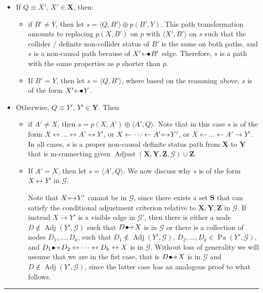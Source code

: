 \documentclass[twoside]{article}
\DeclareMathOperator{\Pa}{Pa}
\DeclareMathOperator{\Adj}{Adj}
\DeclareMathOperator{\Adjust}{Adjust}
\newcommand{\adjustb}[2][X,Y,Z]{\Adjust(\mb{#1},#2)}
\newcommand{\mb}[1]{\mathbf{#1}}
\newcommand{\g}[1][G]{\mathcal{#1}}
\newenvironment{proofof}[1][]{\begin{trivlist}
\item[\hskip \labelsep {\bfseries Proof of #1.}]}{\hfill\BlackBox\end{trivlist}}
\newcommand{\BlackBox}{\rule{1.5ex}{1.5ex}}
\newcommand{\bulletarrow}{
  \setlength{\unitlength}{1mm}
  \begin{picture}(5,1)(0,0)
    \put(0.2,0){$\bullet$}
    \put(1,0){$\rightarrow$}
  \end{picture}
}
\newcommand{\arrowbullet}{
  \setlength{\unitlength}{1mm}
  \begin{picture}(5,1)(0,0)
    \put(0.2,0){$\leftarrow$}
    \put(3,0){$\bullet$}
  \end{picture}
}
\newcommand{\circarrow}{
  \setlength{\unitlength}{1mm}
  \begin{picture}(5,1)(0,0)
    \put(1,1){\circle{1}}
    \put(1.2,0){$\rightarrow$}
  \end{picture}
}
\begin{document}
\begin{proofof}[Lemma \ref{lem:adjust-and-o-pag-helper}]
\begin{itemize}
     
        \item If $Q \equiv X'$, $X' \in \mb{X}$, then:
          \begin{itemize}
            \item if $B' \neq Y$, then let $s = \langle Q,B' \rangle \oplus p(B',Y)$. This path transformation amounts to replacing $p(X,B')$ on $p$ with  $\langle X', B' \rangle$ on $s$ such that the collider / definite non-collider status of $B'$ is the same on both paths, and $s$ is a non-causal path because of $X' \arrowbullet B'$ edge. Therefore, $s$ is a path with the same properties as $p$ shorter than $p$.
            \item If $B' = Y$, then let $s = \langle Q, B'\rangle$, where based on the reasoning above, $s$ is of the form $X' \arrowbullet Y$.
        \end{itemize}
 
        \item Otherwise, $Q \equiv Y'$, $Y' \in \mb{Y}$. Then
        \begin{itemize}
            \item if $A' \neq X$, then $s = p(X,A') \oplus \langle A',Q \rangle$. Note that in this case $s$ is of the form $X \leftrightarrow \dots \leftrightarrow A' \leftrightarrow Y'$, or $X \leftarrow \dots \leftarrow A' \circarrow Y'$, or $X \leftarrow \dots \leftarrow A' \to Y'$. In all cases, $s$ is a proper non-causal definite status path from $\mb{X}$ to $\mb{Y}$ that is m-connecting given $\adjustb{\g} \cup \mb{Z}.$
            \item If $A' = X$, then let $s =\langle A', Q \rangle$. We now discuss why $s$ is of the form $X \leftrightarrow Y'$ in $\g$. 
           
            Note that $X \circarrow Y'$ cannot be in $\g$, since there exists a set $\mb{S}$ that can satisfy the conditional adjustment criterion relative to $\mb{X,Y,Z}$ in $\g$.     
        If instead $X \to Y'$ is a visible edge in $\g'$, then there is either a node $D \notin \Adj(Y', \g)$ such that $D \bulletarrow X$ is in $\g$ or there is a collection of nodes $D_1, \dots, D_k$, such that $D_1 \notin \Adj(Y', \g)$, $D_2, \dots, D_k \in \Pa(Y', \g)$, and $D_1 \bulletarrow D_2 \leftrightarrow \dots \leftrightarrow D_k \leftrightarrow X$ is in $\g$. Without loss of generality we will assume that we are in the fist case, that is $D \bulletarrow X$ is in $\g$ and $D \notin \Adj(Y', \g)$, since the latter case has an analogous proof to what follows. 


\end{itemize}
\end{itemize}
\end{proofof}
\end{document}
